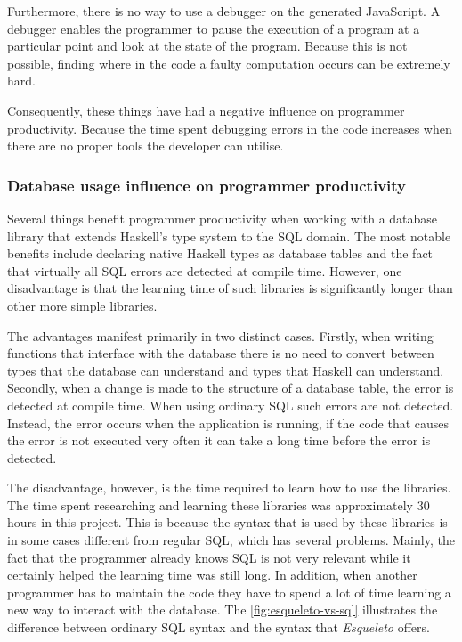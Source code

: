 \documentclass[a4paper]{article}
\begin{document}
Furthermore, there is no way to use a debugger on the generated JavaScript. A debugger enables the programmer to pause the execution of a program at a particular point and look at the state of the program. Because this is not possible, finding where in the code a faulty computation occurs can be extremely hard.

Consequently, these things have had a negative influence on programmer productivity. Because the time spent debugging errors in the code increases when there are no proper tools the developer can utilise.

\subsubsection{Database usage influence on programmer productivity}
\label{subsub:database-results}
Several things benefit programmer productivity when working with a database library that extends Haskell's type system to the SQL domain. The most notable benefits include declaring native Haskell types as database tables and the fact that virtually all SQL errors are detected at compile time. However, one disadvantage is that the learning time of such libraries is significantly longer than other more simple libraries.

The advantages manifest primarily in two distinct cases. Firstly, when writing functions that interface with the database there is no need to convert between types that the database can understand and types that Haskell can understand. Secondly, when a change is made to the structure of a database table, the error is detected at compile time. When using ordinary SQL such errors are not detected. Instead, the error occurs when the application is running, if the code that causes the error is not executed very often it can take a long time before the error is detected. 

The disadvantage, however, is the time required to learn how to use the libraries. The time spent researching and learning these libraries was approximately 30 hours in this project. This is because the syntax that is used by these libraries is in some cases different from regular SQL, which has several problems. Mainly, the fact that the programmer already knows SQL is not very relevant while it certainly helped the learning time was still long. In addition, when another programmer has to maintain the code they have to spend a lot of time learning a new way to interact with the database. The \cref{fig:esqueleto-vs-sql} illustrates the difference between ordinary SQL syntax and the syntax that \textit{Esqueleto} offers.
\end{document}
